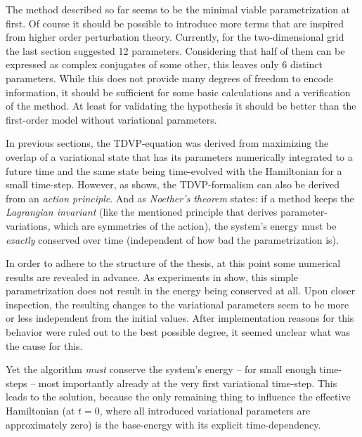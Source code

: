The method described so far seems to be the minimal viable parametrization at first.
Of course it should be possible to introduce more terms that are inspired from higher order perturbation theory.
Currently, for the two-dimensional grid the last section suggested 12 parameters. 
Considering that half of them can be expressed as complex conjugates of some other, this leaves only 6 distinct parameters.
While this does not provide many degrees of freedom to encode information, it should be sufficient for some basic calculations and a verification of the method.
At least for validating the hypothesis it should be better than the first-order model without variational parameters.

In previous sections, the TDVP-equation was derived from maximizing the overlap of a variational state that has its parameters numerically integrated to a future time and the same state being time-evolved with the Hamiltonian for a small time-step.
However, as \cite{TDVPcomplexPrefactors} shows, the TDVP-formalism can also be derived from an \emph{action principle}.
And as \emph{Noether's theorem} states: if a method keeps the \emph{Lagrangian invariant} (like the mentioned principle that derives parameter-variations, which are symmetries of the action), the system's energy must be \emph{exactly} conserved over time \cite{energyConservationFromActionPrinciple} (independent of how \glqq bad\grqq{} the parametrization is).

In order to adhere to the structure of the thesis, at this point some numerical results are revealed in advance. 
As experiments in  show, this simple parametrization does not result in the energy being conserved at all.
Upon closer inspection, the resulting changes to the variational parameters seem to be more or less independent from the initial values.
After implementation reasons for this behavior were ruled out to the best possible degree, it seemed unclear what was the cause for this.

Yet the algorithm \emph{must} conserve the system's energy -- for small enough time-steps -- most importantly already at the very first variational time-step.
This leads to the solution, because the only remaining thing to influence the effective Hamiltonian (at $t=0$, where all introduced variational parameters are approximately zero) is the base-energy with its explicit time-dependency.

